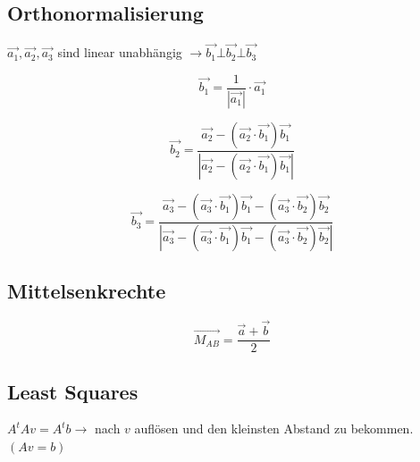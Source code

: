 \subsection{Orthonormalisierung}
	$\vec{a_1}, \vec{a_2}, \vec{a_3}$ sind linear unabhängig $\longrightarrow \vec{b_1} \bot \vec{b_2} \bot \vec{b_3}$\\
	\begin{minipage}{3cm}
		\begin{equation*}
			\vec{b_1} = \frac{1}{|\vec{a_1}|} \cdot \vec{a_1}
		\end{equation*}
	\end{minipage}
	\begin{minipage}{5cm}
		\begin{equation*}
			\vec{b_2} = \frac{\vec{a_2} - (\vec{a_2} \cdot \vec{b_1}) \vec{b_1}}{|\vec{a_2} - (\vec{a_2} \cdot \vec{b_1}) \vec{b_1}|}
		\end{equation*}
	\end{minipage}
	\begin{minipage}{5cm}
		\begin{equation*}
			\vec{b_3} = \frac{\vec{a_3} - (\vec{a_3} \cdot \vec{b_1})\vec{b_1} - (\vec{a_3} \cdot \vec{b_2})\vec{b_2}}
					{|\vec{a_3} - (\vec{a_3} \cdot \vec{b_1})\vec{b_1} - (\vec{a_3} \cdot \vec{b_2})\vec{b_2}|}
		\end{equation*}
	\end{minipage}

\subsection{Mittelsenkrechte}
	\begin{equation*}
		\vec{M_{AB}} = \frac{\vec{a} + \vec{b}}{2}
	\end{equation*}

\subsection{Least Squares}
	$A^tAv = A^tb \longrightarrow$ nach $v$ auflösen und den kleinsten Abstand zu bekommen. \qquad $(Av = b)$
		
